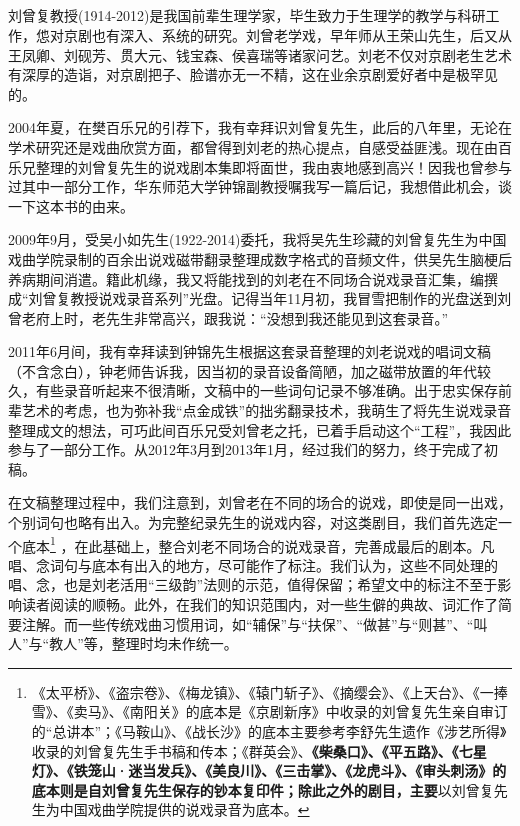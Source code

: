 \hypertarget{ux540e-ux8bb0-ux4e0e-ux81f4-ux8c22}{%
	\subsection{}\label{ux540e-ux8bb0-ux4e0e-ux81f4-ux8c22}}

刘曾复教授(1914-2012)是我国前辈生理学家，毕生致力于生理学的教学与科研工作，怹对京剧也有深入、系统的研究。刘曾老学戏，早年师从王荣山先生，后又从王凤卿、刘砚芳、贯大元、钱宝森、侯喜瑞等诸家问艺。刘老不仅对京剧老生艺术有深厚的造诣，对京剧把子、脸谱亦无一不精，这在业余京剧爱好者中是极罕见的。

2004年夏，在樊百乐兄的引荐下，我有幸拜识刘曾复先生，此后的八年里，无论在学术研究还是戏曲欣赏方面，都曾得到刘老的热心提点，自感受益匪浅。现在由百乐兄整理的刘曾复先生的说戏剧本集即将面世，我由衷地感到高兴！因我也曾参与过其中一部分工作，华东师范大学钟锦副教授嘱我写一篇后记，我想借此机会，谈一下这本书的由来。

2009年9月，受吴小如先生(1922-2014)委托，我将吴先生珍藏的刘曾复先生为中国戏曲学院录制的百余出说戏磁带翻录整理成数字格式的音频文件，供吴先生脑梗后养病期间消遣。籍此机缘，我又将能找到的刘老在不同场合说戏录音汇集，编撰成``刘曾复教授说戏录音系列''光盘。记得当年11月初，我冒雪把制作的光盘送到刘曾老府上时，老先生非常高兴，跟我说：``没想到我还能见到这套录音。''

2011年6月间，我有幸拜读到钟锦先生根据这套录音整理的刘老说戏的唱词文稿（不含念白），钟老师告诉我，因当初的录音设备简陋，加之磁带放置的年代较久，有些录音听起来不很清晰，文稿中的一些词句记录不够准确。出于忠实保存前辈艺术的考虑，也为弥补我``点金成铁''的拙劣翻录技术，我萌生了将先生说戏录音整理成文的想法，可巧此间百乐兄受刘曾老之托，已着手启动这个``工程''，我因此参与了一部分工作。从2012年3月到2013年1月，经过我们的努力，终于完成了初稿。

在文稿整理过程中，我们注意到，刘曾老在不同的场合的说戏，即使是同一出戏，个别词句也略有出入。为完整纪录先生的说戏内容，对这类剧目，我们首先选定一个底本\footnote{《太平桥》、《盗宗卷》、《梅龙镇》、《辕门斩子》、《摘缨会》、《上天台》、《一捧雪》、《卖马》、《南阳关》的底本是《京剧新序》中收录的刘曾复先生亲自审订的``总讲本''；《马鞍山》、《战长沙》的底本主要参考李舒先生遗作《涉艺所得》收录的刘曾复先生手书稿和传本；《群英会》、\textbf{《柴桑口》、《平五路》、《七星灯》、《铁笼山·迷当发兵》、《美良川》、《三击掌》、《龙虎斗》、《审头刺汤》的底本则是自刘曾复先生保存的钞本复印件；除此之外的剧目，主要}以刘曾复先生为中国戏曲学院提供的说戏录音为底本。%
}%
，在此基础上，整合刘老不同场合的说戏录音，完善成最后的剧本。凡唱、念词句与底本有出入的地方，尽可能作了标注。我们认为，这些不同处理的唱、念，也是刘老活用``三级韵''法则的示范，值得保留；希望文中的标注不至于影响读者阅读的顺畅。此外，在我们的知识范围内，对一些生僻的典故、词汇作了简要注解。而一些传统戏曲习惯用词，如``辅保''与``扶保''、``做甚''与``则甚''、``叫人''与``教人''等，整理时均未作统一。

